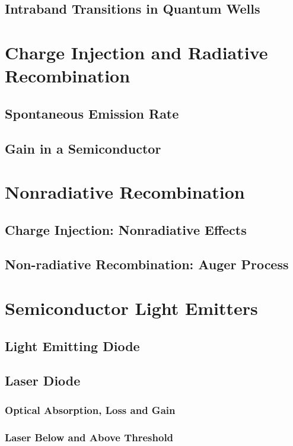 \subsection{Intraband Transitions in Quantum Wells}



\section{Charge Injection and Radiative Recombination}
\subsection{Spontaneous Emission Rate}
\subsection{Gain in a Semiconductor}



\section{Nonradiative Recombination}
\subsection{Charge Injection: Nonradiative Effects}
\subsection{Non-radiative Recombination: Auger Process}


\section{Semiconductor Light Emitters}
\subsection{Light Emitting Diode}
\subsection{Laser Diode}
\subsubsection{Optical Absorption, Loss and Gain}
\subsubsection{Laser Below and Above Threshold}